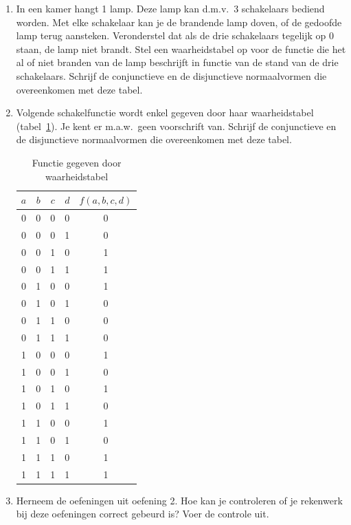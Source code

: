 \begin{enumerate}
\item In een kamer hangt 1 lamp. Deze lamp kan d.m.v.\ 3 schakelaars bediend worden. Met elke schakelaar kan je de brandende lamp doven, of de gedoofde lamp terug aansteken. Veronderstel dat als de drie schakelaars tegelijk op $0$ staan, de lamp niet brandt. Stel een waarheidstabel op voor de functie die het al of niet branden van de lamp beschrijft in functie van de stand van de drie schakelaars. Schrijf de conjunctieve en de disjunctieve normaalvormen die overeenkomen met deze tabel.
\item Volgende schakelfunctie wordt enkel gegeven door haar waarheidstabel (tabel~\ref{tbl:oefwaarh}). Je kent er m.a.w.\ geen voorschrift van. Schrijf de conjunctieve en de disjunctieve normaalvormen die overeenkomen met deze tabel.
\begin{table}[htb]
  \centering
\begin{tabular}{|cccc|c|}
\hline
  $a$ & $b$ & $c$ & $d$ & $f(a,b,c,d)$ \\ \hline \hline
  0 & 0 & 0 & 0 & 0 \\
  0 & 0 & 0 & 1 & 0 \\
  0 & 0 & 1 & 0 & 1 \\ 
  0 & 0 & 1 & 1 & 1 \\
  0 & 1 & 0 & 0 & 1 \\
  0 & 1 & 0 & 1 & 0 \\
  0 & 1 & 1 & 0 & 0 \\
  0 & 1 & 1 & 1 & 0 \\
  1 & 0 & 0 & 0 & 1 \\
  1 & 0 & 0 & 1 & 0 \\
  1 & 0 & 1 & 0 & 1 \\
  1 & 0 & 1 & 1 & 0 \\
  1 & 1 & 0 & 0 & 1 \\
  1 & 1 & 0 & 1 & 0 \\
  1 & 1 & 1 & 0 & 1 \\
  1 & 1 & 1 & 1 & 1 \\
\hline
\end{tabular}
  \caption{Functie gegeven door waarheidstabel}\label{tbl:oefwaarh}
\end{table}

\item Herneem de oefeningen uit oefening 2. Hoe kan je controleren of je rekenwerk bij deze oefeningen correct gebeurd is? Voer de controle uit.
\end{enumerate}


